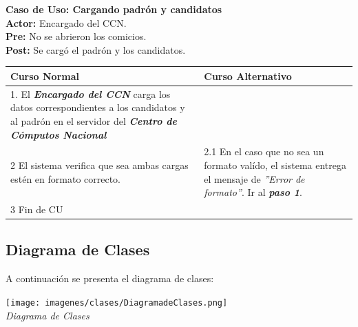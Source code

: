 \documentclass[spanish, 10pt,a4paper]{article}
\numberwithin{equation}{section} %
\begin{document}
\newpage
\noindent\textbf{Caso de Uso: Cargando padrón y candidatos}\\
\textbf{Actor: } Encargado del CCN.\\
\textbf{Pre: } No se abrieron los comicios.\\
\textbf{Post: } Se cargó el padrón y los candidatos.\\
\begin{table}[H]
  \centering
\bgroup
\def\arraystretch{1.3}
  \begin{tabular}{p{9cm} | p{7cm}}
    \hline
    Curso Normal & Curso Alternativo \\
    \hline
    \hline    
    1. El \textbf{\textit{Encargado del CCN}} carga los datos correspondientes a los candidatos y al padrón en el servidor del \textbf{\textit{Centro de Cómputos Nacional}}
    & \\
    
    \hline
    2 El sistema verifica que sea ambas cargas estén en formato correcto.
    & 
    2.1 En el caso que no sea un formato valído, el sistema entrega el mensaje de \textit{''Error de formato''}. Ir al \textbf{\textit{paso 1}}.
    \\
       
    \hline
    3 Fin de CU
    & \\
    \hline
  \end{tabular}
\egroup
\end{table}


\newpage
\subsection{Diagrama de Clases}
	A continuación se presenta el diagrama de clases:

\vspace{\baselineskip}
    \begin{center}
                \texttt{[image: imagenes/clases/DiagramadeClases.png]}
                \\
                \vspace{1pt}
                \footnotesize\textit{Diagrama de Clases}
        \end{center}
\vspace{\baselineskip}
\end{document}
